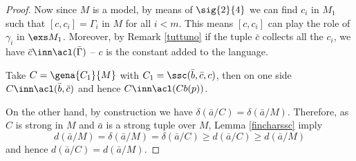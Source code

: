 \begin{proof}
%
%
%
%

\medskip
Now since $M$ is a model, by means of $\sig{2}{4}$ we can find $c_{i}$ in $M_{1}$ such that
$[c,c_{i}]=\Gamma_{i}$ in $M$ for all $i<m$. This means $[c,c_{i}]$ can play the role of $\gamma_{i}$ in $\exs M_{1}$.
Moreover, by Remark \ref{tuttuno} if the tuple $\bar c$ collects all the $c_{i}$, %
we have $\bar c\inn\acl(\bar\Gamma)$ -- $c$ is the constant added to the language.

Take $C=\gena{C_{1}}{M}$ with $C_{1}=\ssc(\bar b,\bar c,c)$,
then on one side $C\inn\acl(\bar b,\bar c)$ and hence $C\inn\acl(Cb(p))$.

\medskip
On the other hand, by construction we have $\delta(\bar a/C)=\delta(\bar a/M)$. %
Therefore, as $C$ is strong in $M$ and $\bar a$ is a strong tuple over $M$, Lemma \ref{fincharssc} imply
$$
d(\bar a/M)=\delta(\bar a/M)=\delta(\bar a/C)\geq d(\bar a/C)\geq d(\bar a/M)
$$
and hence $d(\bar a/C)=d(\bar a/M)$.


\end{proof}
